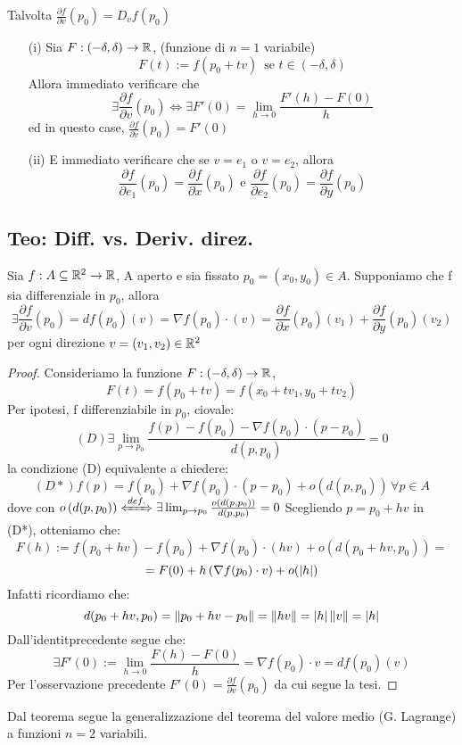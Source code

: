 \begin{notazione}
  Talvolta $\frac{\partial f}{\partial v} (p_0) = D_v f(p_0)$
\end{notazione}
\begin{osservazione}
  \begin{enumerate}
    \item[(i)] Sia $F : (-\delta,\delta) \to \mathbb{R}$, (funzione di $n=1$ variabile)
               $$F(t) := f(p_0+tv) \, \text{ se } t \in (-\delta,\delta)$$
               Allora \ace immediato verificare che 
               $$\exists \frac{\partial f}{\partial v} (p_0) \iff \exists F'(0) = \lim_{h\to 0} \frac{F'(h)-F(0)}{h}$$
               ed in questo case, $\frac{\partial f}{\partial v} (p_0) = F'(0)$
    \item[(ii)] \ac{E} immediato verificare che se $v = e_1$ o $v = e_2$, allora 
                $$\frac{\partial f}{\partial e_1} (p_0) = \frac{\partial f}{\partial x} (p_0) \text{ e }
                \frac{\partial f}{\partial e_2} (p_0) = \frac{\partial f}{\partial y} (p_0)$$ 
  \end{enumerate}
\end{osservazione}
\subsection{Teo: Diff. vs. Deriv. direz.}
\begin{theorem}
  Sia $f: A \subseteq \mathbb{R}^2 \to \mathbb{R}$, A aperto e sia fissato $p_0 = (x_0,y_0) \in A$. Supponiamo che f sia differenziale in $p_0$, allora
  $$\exists \frac{\partial f}{\partial v} (p_0) = df(p_0)(v) = \nabla f(p_0) \cdot (v) = \frac{\partial f}{\partial x} (p_0)(v_1) + \frac{\partial f}{\partial y} (p_0) (v_2)$$
  per ogni direzione $v = (v_1,v_2) \in \mathbb{R}^2$
  \begin{proof}
    Consideriamo la funzione $F: (-\delta,\delta)\to \mathbb{R}$, 
    $$F(t) = f(p_0 +tv) = f(x_0+tv_1,y_0+tv_2)$$
    Per ipotesi, f \ace differenziabile in $p_0$, cio\ace vale:
    $$(D) \exists \lim_{p\to p_0} \frac{f(p)-f(p_0)-\nabla f(p_0)\cdot (p-p_0)}{d(p,p_0)} = 0$$
    la condizione (D) \ace equivalente a chiedere:
    $$(D*) f(p) = f(p_0) + \nabla f (p_0) \cdot (p-p_0) + o\left(d(p,p_0)\right) \, \forall p \in A$$
    dove con $o\left(d(p,p_0)\right) \xLeftrightarrow{def.} \exists \lim_{p\to p_0} \frac{o(d(p,p_0))}{d(p,p_0)}=0$
    Scegliendo $p = p_0+hv$ in (D*), otteniamo che:
    $$F(h) := f(p_0+hv) - f(p_0)+\nabla f(p_0)\cdot (hv) + o(d(p_0+hv,p_0)) = $$
    $$= F(0) + h\left(\nabla f(p_0)\cdot v\right) + o(\left\lvert h \right\rvert)$$
    Infatti ricordiamo che: 
    $$d(p_0+hv,p_0) =  \left\lVert p_0+hv-p_0\right\rVert = \left\lVert hv\right\rVert = \left\lvert h \right\rvert\left\lVert v\right\rVert = \left\lvert h \right\rvert$$
    Dall'identit\aca precedente segue che:
    $$\exists F'(0) := \lim_{h\to 0}\frac{F(h) - F(0)}{h} = \nabla f(p_0) \cdot v = df(p_0)(v)$$
    Per l'osservazione precedente $F'(0) = \frac{\partial f}{\partial v} (p_0)$ da cui segue la tesi.
  \end{proof}
\end{theorem}
Dal teorema segue la generalizzazione del teorema del valore medio (G. Lagrange) a funzioni $n=2$ variabili.
